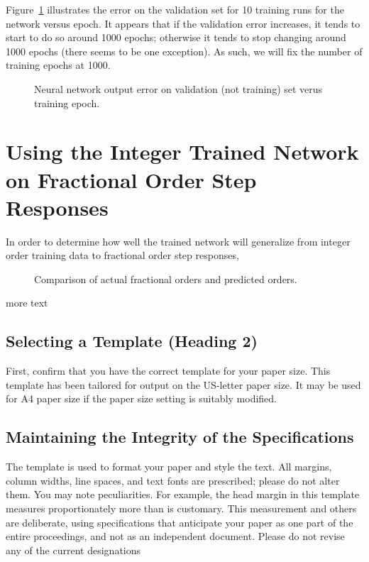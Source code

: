 \documentclass[letterpaper, 10 pt, conference]{ieeeconf}  %
\begin{document}
 
Figure~\ref{fig:epochs} illustrates the error on the validation set for 10
training runs for the network versus epoch. It appears that if the validation
error increases, it tends to start to do so around 1000 epochs; otherwise it
tends to stop changing around 1000 epochs (there seems to be one exception). As
such, we will fix the number of training epochs at 1000.

\begin{figure}
\centering

\vspace*{-5pt}
\caption{Neural network output error on validation (not training) set verus
training epoch.}
\label{fig:epochs}
\end{figure}


\section{Using the Integer Trained Network on Fractional Order Step Responses}

In order to determine how well the trained network will generalize from integer
order training data to fractional order step responses, 

\begin{figure}
\centering

\vspace*{-5pt}
\caption{Comparison of actual fractional orders and predicted orders.}
\label{fig:accuracy}
\end{figure}

more text

\subsection{Selecting a Template (Heading 2)}

First, confirm that you have the correct template for your paper size. This template has been tailored for output on the US-letter paper size. 
It may be used for A4 paper size if the paper size setting is suitably modified.
\subsection{Maintaining the Integrity of the Specifications}

The template is used to format your paper and style the text. All margins, column widths, line spaces, and text fonts are prescribed; please do not alter them. You may note peculiarities. For example, the head margin in this template measures proportionately more than is customary. This measurement and others are deliberate, using specifications that anticipate your paper as one part of the entire proceedings, and not as an independent document. Please do not revise any of the current designations
\end{document}
